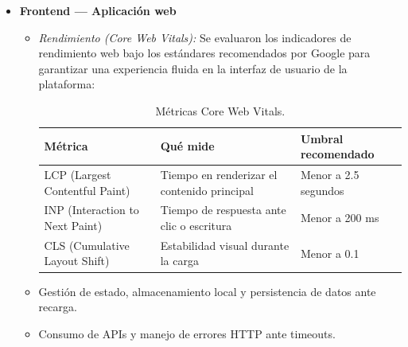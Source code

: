 \documentclass[12pt, atypical, journal]{article}
\begin{document}
\begin{itemize}
    \item \textbf{Frontend — Aplicación web}
    \begin{itemize}
    \item \textit{Rendimiento (Core Web Vitals):} Se evaluaron los indicadores de rendimiento web bajo los estándares recomendados por Google para garantizar una experiencia fluida en la interfaz de usuario de la plataforma:
    \begin{table}[H]
    \centering
    \small
    \begin{tabular}{|l|p{5cm}|p{4.5cm}|}
    \hline
    \textbf{Métrica} & \textbf{Qué mide} & \textbf{Umbral recomendado} \\ \hline
    LCP (Largest Contentful Paint) & Tiempo en renderizar el contenido principal & Menor a 2.5 segundos \\ \hline
    INP (Interaction to Next Paint) & Tiempo de respuesta ante clic o escritura & Menor a 200 ms \\ \hline
    CLS (Cumulative Layout Shift) & Estabilidad visual durante la carga & Menor a 0.1 \\ \hline
    \end{tabular}
    \caption{Métricas Core Web Vitals.}
    \label{tab:core_web_vitals}
    \end{table}
    \item Gestión de estado, almacenamiento local y persistencia de datos ante recarga.
    \item Consumo de APIs y manejo de errores HTTP ante timeouts.
\end{itemize}


\end{itemize}
\end{document}
